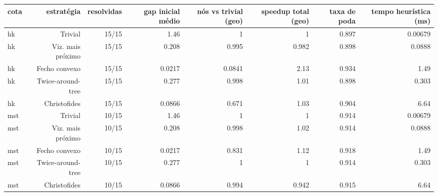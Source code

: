 \begin{tabular}{lrrrrrrr}
\hline
cota & estratégia & resolvidas & gap inicial médio & nós vs trivial (geo) & speedup total (geo) & taxa de poda & tempo heurística (ms) \\
\hline
hk & Trivial & 15/15 & 1.46 & 1 & 1 & 0.897 & 0.00679 \\
hk & Viz. mais próximo & 15/15 & 0.208 & 0.995 & 0.982 & 0.898 & 0.0888 \\
hk & Fecho convexo & 15/15 & 0.0217 & 0.0841 & 2.13 & 0.934 & 1.49 \\
hk & Twice-around-tree & 15/15 & 0.277 & 0.998 & 1.01 & 0.898 & 0.303 \\
hk & Christofides & 15/15 & 0.0866 & 0.671 & 1.03 & 0.904 & 6.64 \\
mst & Trivial & 10/15 & 1.46 & 1 & 1 & 0.914 & 0.00679 \\
mst & Viz. mais próximo & 10/15 & 0.208 & 0.998 & 1.02 & 0.914 & 0.0888 \\
mst & Fecho convexo & 10/15 & 0.0217 & 0.831 & 1.12 & 0.918 & 1.49 \\
mst & Twice-around-tree & 10/15 & 0.277 & 1 & 1 & 0.914 & 0.303 \\
mst & Christofides & 10/15 & 0.0866 & 0.994 & 0.942 & 0.915 & 6.64 \\
\hline
\end{tabular}
